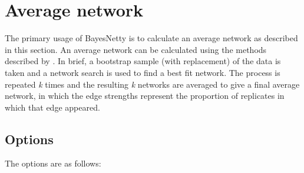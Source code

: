 \documentclass[a4paper,12pt]{article}
\begin{document}

\section{Average network}
\label{average-network}

The primary usage of BayesNetty is to calculate an average network as described in this section. An average network can be calculated using the methods described by \citet{bnlearn}. In brief, a bootstrap sample (with replacement) of the data is taken and a network search is used to find a best fit network. The process is repeated {\it k} times and the resulting {\it k} networks are averaged to give a final average network, in which the edge strengths represent the proportion of replicates in which that edge appeared. 
\subsection{Options}
\label{average-network-options}

The options are as follows: 
\end{document}
